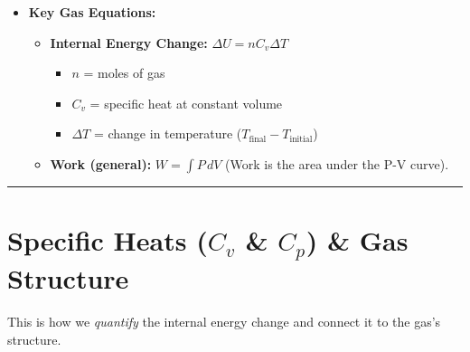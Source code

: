 \documentclass[article]{article}
\begin{document}
\begin{itemize}
\begin{itemize}
\begin{itemize}
                \item $W < 0$: Work is done on the system (compresses, $V_{\text{final}} < V_{\text{initial}}$).
            \end{itemize}
    \end{itemize}
    \item \textbf{Key Gas Equations:}
    \begin{itemize}
        \item \textbf{Internal Energy Change:} $\Delta U = nC_v\Delta T$
            \begin{itemize}
                \item $n$ = moles of gas
                \item $C_v$ = specific heat at constant volume
                \item $\Delta T$ = change in temperature ($T_{\text{final}} - T_{\text{initial}}$)
            \end{itemize}
        \item \textbf{Work (general):} $W = \int P \, dV$ (Work is the area under the P-V curve).
    \end{itemize}
\end{itemize}

\hrule

\section{Specific Heats ($C_v$ \& $C_p$) \& Gas Structure}

This is how we \textit{quantify} the internal energy change and connect it to the gas's structure.
\end{document}
